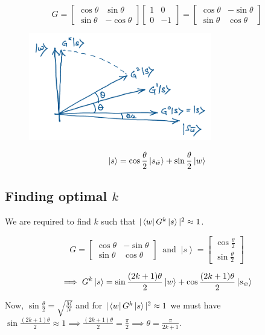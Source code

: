 \documentclass[11.5pt, paper=a4]{article}
\theoremstyle{definition}
\numberwithin{theorem}{section}
\newcommand{\ket}[1]{\ensuremath{\left|#1\right\rangle}}
\begin{document}
$$G = \begin{bmatrix}\cos \theta & \sin \theta\\ \sin \theta & -\cos \theta\end{bmatrix}\begin{bmatrix}1 & 0\\ 0 & -1 \end{bmatrix} = \begin{bmatrix}\cos \theta & -\sin \theta\\ \sin \theta & \cos \theta\end{bmatrix}$$

\begin{figure}[H]
    \centering
    \includegraphics[width=80mm]{images/2.png}
\end{figure}

$$\ket{s} = \cos \frac{\theta}{2} \ket{s_{\Bar{w}}} + \sin \frac{\theta}{2} \ket{w}$$

\subsection{Finding optimal $k$}
We are required to find $k$ such that $|\bra{w}G^k\ket{s}|^2 \approx 1$.

$$G = \begin{bmatrix}\cos \theta & -\sin \theta\\ \sin \theta & \cos \theta\end{bmatrix}\ \text{ and }\ \ket{s} = \begin{bmatrix}\cos \frac{\theta}{2}\\ \sin \frac{\theta}{2}\end{bmatrix}$$

$$\implies G^k\ket{s} = \sin\frac{(2k + 1)\theta}{2} \ket{w} + \cos \frac{(2k + 1)\theta}{2}\ket{s_{\Bar{w}}}$$

Now, $\sin \frac{\theta}{2} = \sqrt{\frac{M}{N}}$ and for $|\bra{w}G^k\ket{s}|^2 \approx 1$ we must have $\sin \frac{(2k + 1)\theta}{2} \approx 1 \implies \frac{(2k + 1)\theta}{2} = \frac{\pi}{2} \implies \theta = \frac{\pi}{2k + 1}$.
\end{document}
